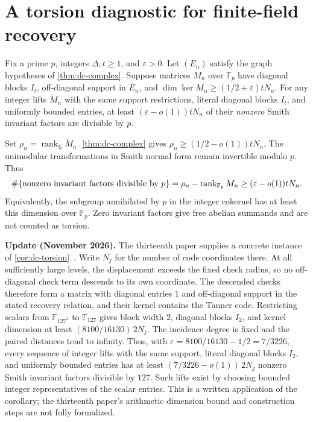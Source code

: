 \section{A torsion diagnostic for finite-field recovery}\label{sec:torsion}

\begin{corollary}
\label{cor:dc-torsion}
Fix a prime $p$, integers $\Delta,t\ge1$, and $\varepsilon>0$.
Let $(E_n)$ satisfy the graph hypotheses of \cref{thm:dc-complex}.
Suppose matrices $M_n$ over $\mathbb F_p$ have diagonal blocks $I_t$,
off-diagonal support in $E_n$, and
$\dim\ker M_n\ge(1/2+\varepsilon)tN_n$.
For any integer lifts $\widetilde M_n$ with the same support restrictions,
literal diagonal blocks $I_t$, and uniformly bounded entries, at least
$(\varepsilon-o(1))tN_n$ of their \emph{nonzero} Smith invariant factors
are divisible by $p$.
\end{corollary}
\begin{informalproof}
Set $\rho_n=\operatorname{rank}_{\mathbb Q}\widetilde M_n$.
\cref{thm:dc-complex} gives $\rho_n\ge(1/2-o(1))tN_n$.
The unimodular transformations in Smith normal form remain invertible
modulo $p$.  Thus
\[
 \#\{\hbox{nonzero invariant factors divisible by }p\}
 =\rho_n-\operatorname{rank}_{\mathbb F_p}M_n
 \ge(\varepsilon-o(1))tN_n.
\]
Equivalently, the subgroup annihilated by $p$ in the integer cokernel
has at least this dimension over $\mathbb F_p$.  Zero invariant factors
give free abelian summands and are not counted as torsion.
\end{informalproof}

\textbf{Update (November 2026).} The thirteenth paper supplies a concrete
instance of \cref{cor:dc-torsion}~\cite[Theorems~A and~T, Lemma~5.2]{StorageCodes2026}.
Write $N_j$ for the number of code coordinates there. At all sufficiently
large levels, the displacement exceeds the fixed check radius, so no
off-diagonal check term descends to its own coordinate. The descended
checks therefore form a matrix with diagonal entries $1$ and off-diagonal
support in the stated recovery relation, and their kernel contains the
Tanner code. Restricting scalars from $\mathbb F_{127^2}$ to
$\mathbb F_{127}$ gives block width $2$, diagonal blocks $I_2$, and
kernel dimension at least $(8100/16130)\,2N_j$.
The incidence degree is fixed and the paired distances tend to infinity.
Thus, with $\varepsilon=8100/16130-1/2=7/3226$, every sequence of integer
lifts with the same support, literal diagonal blocks $I_2$, and uniformly
bounded entries has at least $(7/3226-o(1))\,2N_j$ nonzero Smith invariant
factors divisible by $127$. Such lifts exist by choosing bounded integer
representatives of the scalar entries. This is a written application of
the corollary; the thirteenth paper's arithmetic dimension bound and
construction steps are not fully formalized.

